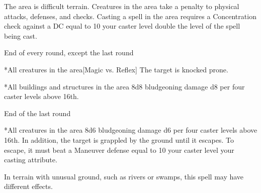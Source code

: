 \begin{spellheader}
\end{spellheader}
\begin{spelleffects}
    \spelleffect The area is difficult terrain. Creatures in the area take a  penalty to physical attacks, defenses, and checks. Casting a spell in the area requires a Concentration check against a DC equal to 10 \add your caster level \add double the level of the spell being cast.
    \begin{spelltrigger}{End of every round, except the last round}
        \begin{spelltarget}*{All creatures in the area}[Magic vs. Reflex]
            \spellsuccess The target is knocked prone.
        \end{spelltarget}
        \begin{spelltarget}*{All buildings and structures in the area}
            \spelleffect 8d8 bludgeoning damage \add d8 per four caster levels above 16th.
        \end{spelltarget}
    \end{spelltrigger}
    \begin{spelltrigger}{End of the last round}
        \begin{spelltarget}*{All creatures in the area}
            \spelleffect 8d6 bludgeoning damage \add d6 per four caster levels above 16th. In addition, the target is grappled by the ground until it escapes. To escape, it must beat a Maneuver defense equal to 10 \add your caster level \add your casting attribute.
        \end{spelltarget}
    \end{spelltrigger}
\end{spelleffects}
\begin{spellfooter}
    \spellnotes In terrain with unusual ground, such as rivers or swamps, this spell may have different effects.
\end{spellfooter}

